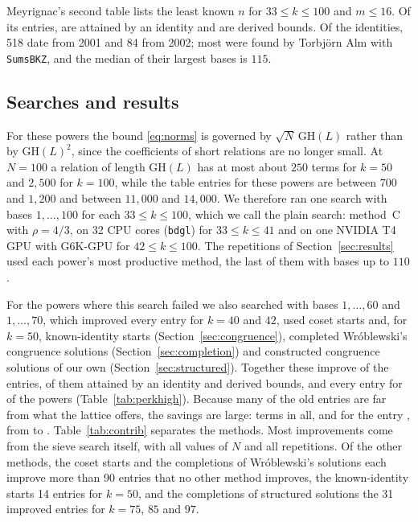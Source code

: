 \documentclass[11pt]{amsart}
\theoremstyle{definition}
\theoremstyle{remark}
\newcommand{\GH}{\mathrm{GH}}
\begin{document}
Meyrignac's second table lists the least known $n$ for $33\le k\le100$ and $m\le16$. Of its
\HNumCells{} entries, \HNumCellsIdent{} are attained by an identity and \HNumCellsDerived{} are
derived bounds. Of the identities, 518 date from 2001 and 84 from 2002; most were found by
Torbj\"orn Alm with \texttt{SumsBKZ}, and the median of their largest bases is $115$.

\subsection{Searches and results}\label{sec:highsearch}
For these powers the bound \eqref{eq:norms} is governed by $\sqrt N\,\GH(L)$ rather than by
$\GH(L)^2$, since the coefficients of short relations are no longer small. At $N=100$ a
relation of length $\GH(L)$ has at most about $250$ terms for $k=50$ and $2{,}500$ for $k=100$,
while the table entries for these powers are between $700$ and $1{,}200$ and between
$11{,}000$ and $14{,}000$. We therefore ran one search with bases $1,\dots,100$ for each
$33\le k\le100$, which we call the plain search: method~C with $\rho=4/3$, on 32 CPU cores
(\texttt{bdgl}) for $33\le k\le41$ and on one NVIDIA T4 GPU with G6K-GPU for $42\le k\le100$. The repetitions of Section~\ref{sec:results} used
each power's most productive method, the last of them with bases up to $110$.

For the powers where this search failed we also searched with bases $1,\dots,60$ and
$1,\dots,70$, which improved every entry for $k=40$ and $42$, used coset starts and, for $k=50$,
known-identity starts (Section~\ref{sec:congruence}),
completed Wr\'oblewski's congruence solutions (Section~\ref{sec:completion}) and constructed
congruence solutions of our own (Section~\ref{sec:structured}). Together these improve \HNumImproved{} of the \HNumCells{}
entries, \HNumImprovedIdent{} of them attained by an identity and \HNumDerived{} derived
bounds, and every entry for \HNumFullK{} of the \HNumK{} powers (Table~\ref{tab:perkhigh}). Because many of the old
entries are far from what the lattice offers, the savings are large: \HTermsSaved{} terms in
all, and \HMaxGain{} for the entry \HMaxGainCell, from \HMaxGainOld{} to \HMaxGainNew. \HNoneSentence{}
Table~\ref{tab:contrib} separates the methods. Most improvements come from the sieve search
itself, with all values of $N$ and all repetitions. Of the other methods, the coset starts and
the completions of Wr\'oblewski's solutions each improve more than 90 entries that no other
method improves, the known-identity starts 14 entries for $k=50$, and the completions of
structured solutions the 31 improved entries for $k=75$, $85$ and $97$.
\end{document}
